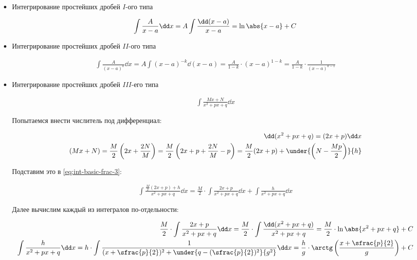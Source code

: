 \label{int-basic-frac}

\begin{itemize}
\item Интегрирование простейших дробей \(I\)-ого типа

\begin{align*}
  \int \frac{A}{x - a}\dd x
  = A \int \frac{\dd (x - a)}{x - a}
  = \ln \abs{x - a} + C
\end{align*}

\item Интегрирование простейших дробей \(II\)-ого типа

\begin{align*}
  \int \frac{A}{(x - a)^{k}}\dd x
  = A \int (x - a)^{-k} \dd (x - a)
  = \frac{A}{1 - k} \cdot (x - a)^{1 - k}
  =\frac{A}{1 - k} \cdot \frac{1}{(x - a)^{k - 1}}
\end{align*}

\item Интегрирование простейших дробей \(III\)-его типа

\begin{align}\label{eq:int-basic-frac-3}\tag{1}
  \int \frac{Mx + N}{x^2 + px + q} \dd x
\end{align}

Попытаемся внести числитель под дифференциал:

\begin{align*}
  \dd (x^2 + px + q) = (2x + p) \dd x \\
  (Mx + N)
  = \frac{M}{2} \left( 2x + \frac{2N}{M} \right)
  = \frac{M}{2} \left( 2x + p + \frac{2N}{M} - p \right)
  = \frac{M}{2} (2x + p) + \under{\left( N - \frac{Mp}{2} \right)}{h}
\end{align*}

Подставим это в \eqref{eq:int-basic-frac-3}:

\begin{align*}
  \int \frac{\frac{M}{2} (2x + p) + h}{x^2 + px + q} \dd x =
  \frac{M}{2} \cdot \int \frac{2x + p}{x^2 + px + q} \dd x + \int \frac{h}{x^2 + px + q} \dd x
\end{align*}

Далее вычислим каждый из интегралов по-отдельности:

\begin{align*}
  \frac{M}{2} \cdot \int \frac{2x + p}{x^2 + px + q} \dd x =
  \frac{M}{2} \cdot \int \frac{\dd (x^2 + px + q)}{x^2 + px + q} =
  \frac{M}{2} \cdot \ln \abs{x^2 + px + q} + C
  \\
  \int \frac{h}{x^2 + px + q} \dd x =
  h \cdot \int \frac{1}{(x + \sfrac{p}{2})^2 +
    \under{q - (\sfrac{p}{2})^2}{g^2}
  } \dd x =
  \frac{h}{g} \cdot \arctg \left(\frac{x + \sfrac{p}{2}}{g}\right) + C
\end{align*}


\end{itemize}
